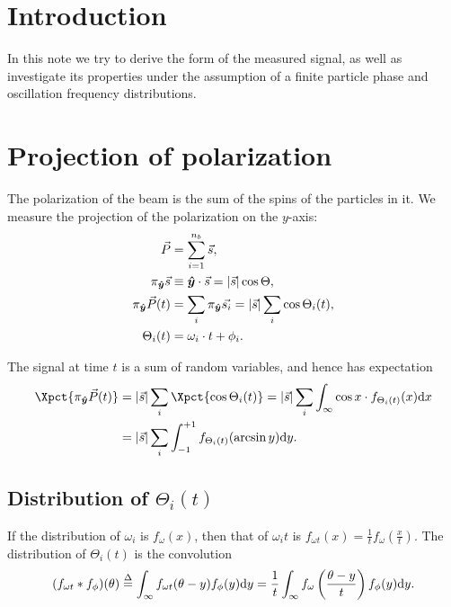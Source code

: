 \documentclass{article}
\newcommand{\nb}{{n_b}}
\newcommand{\uvec}[1]{\boldsymbol{\hat{#1}}}
\newcommand{\abs}[1]{\vert#1\vert}
\newcommand{\proj}[2]{\pi_{\uvec{#2}}\vec{#1}}
\newcommand{\deq}{\overset{\Delta}{=}}
\begin{document}
\section*{Introduction}
In this note we try to derive the form of the measured signal, as well as investigate its properties under the assumption of a finite particle phase and oscillation frequency distributions.

\section{Projection of polarization}
The polarization of the beam is the sum of the spins of the particles in it. We measure the projection of the polarization on the $y$-axis:
\begin{align}
	\vec{P} &= \sum_{i=1}^\nb \vec{s}, \notag\\
	\proj{s}{y} &\equiv \uvec{y}\cdot\vec{s} = \abs{\vec{s}}\cos\Theta, \notag\\
	\proj{P}{y}(t) &= \sum_i \proj{s_i}{y} = \abs{\vec{s}}\sum_i \cos\Theta_i(t), \label{eq:SumSpins}\\
	\Theta_i(t) &= \omega_i\cdot t + \phi_i.\notag
\end{align}

The signal at time $t$ is a sum of random variables, and hence has expectation 
\begin{align*}
	\Xpct{\proj{P}{y}(t)} &= \abs{\vec{s}}\sum_i\Xpct{\cos\Theta_i(t)} = \abs{\vec{s}}\sum_i\int_{\infty}\cos x \cdot f_{\Theta_i(t)}(x)\td x \\
	&= \abs{\vec{s}}\sum_i\int_{-1}^{+1} f_{\Theta_i(t)}(\arcsin y)\td y.
\end{align*}

\subsection{Distribution of $\Theta_i(t)$}
\newcommand{\f}[1]{f_{#1}}
\newcommand{\fw}{\f{\omega}}
\newcommand{\fp}{\f{\phi}}
\newcommand{\fwt}{\f{\omega t}}
\newcommand{\ftht}{\f{\Theta(t)}}

\newcommand{\wycoef}{G}
\newcommand{\dy}{\Delta\gamma}

If the distribution of $\omega_i$ is $\fw(x)$, then that of $\omega_i t$ is $\fwt(x) = \frac{1}{t}\fw(\frac{x}{t})$. The distribution of $\Theta_i(t)$ is the convolution 
\[
	(\fwt*\fp)(\theta) \deq \int_\infty \fwt(\theta-y)\fp(y)\td y = \frac1t \int_\infty \fw\bkt{\frac{\theta-y}{t}}\fp(y)\td y.
\]
\end{document}
